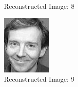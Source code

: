 \documentclass[12pt]{article}
\begin{document}
\begin{figure}
\begin{subfigure}[b]{0.20\textwidth}
		\caption{Reconstructed Image: 8}
	\end{subfigure}\quad
	\begin{subfigure}[b]{0.20\textwidth}
		\includegraphics[width=\textwidth]{Task4.3_Images/ReconstructedImage9.jpg}
		\caption{Reconstructed Image: 9}
	\end{subfigure}\quad
\begin{subfigure}[b]{0.20\textwidth}

\end{subfigure}
\end{figure}
\end{document}
